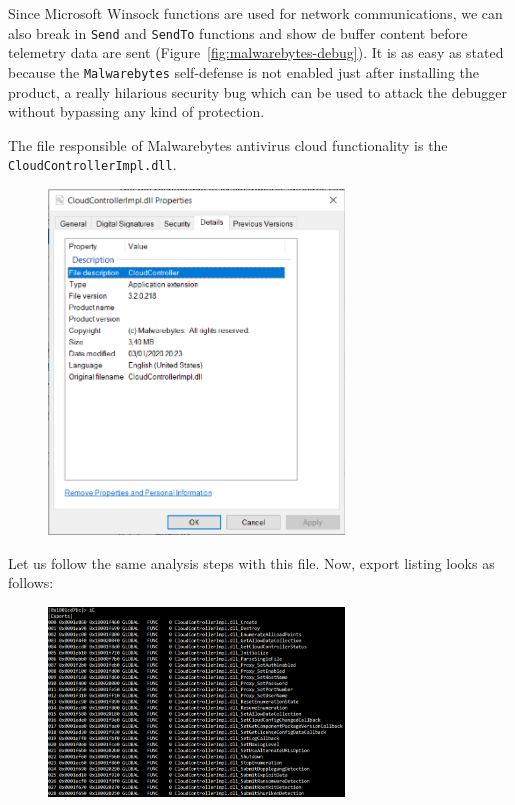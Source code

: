 Since Microsoft Winsock functions are used for network communications, we can
also break in \texttt{Send} and \texttt{SendTo} functions and show de buffer
content before telemetry data are sent
(Figure~\ref{fig:malwarebytes-debug}). It is as easy as stated because the
\texttt{Malwarebytes} self-defense is not enabled just after installing the
product, a really hilarious security bug which can be used to attack the
debugger without bypassing any kind of protection.


The file responsible of Malwarebytes antivirus cloud functionality is the
\texttt{CloudControllerImpl.dll}.
\begin{figure}[h]
  \centering
  \includegraphics[width=0.7\textwidth]{./figures/CloudcontrollerImpl}
\end{figure}


Let us follow the same analysis steps with this file. Now, export listing looks as
follows:
\begin{figure}[h]
  \centering
  \includegraphics[width=0.7\textwidth]{./figures/ExportListing}
\end{figure}


